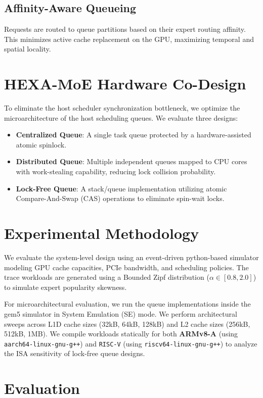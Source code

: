 \documentclass[conference]{IEEEtran}
\begin{document}
\subsection{Affinity-Aware Queueing}
Requests are routed to queue partitions based on their expert routing affinity. This minimizes active cache replacement on the GPU, maximizing temporal and spatial locality.

\section{HEXA-MoE Hardware Co-Design}
To eliminate the host scheduler synchronization bottleneck, we optimize the microarchitecture of the host scheduling queues. We evaluate three designs:
\begin{itemize}
    \item \textbf{Centralized Queue}: A single task queue protected by a hardware-assisted atomic spinlock.
    \item \textbf{Distributed Queue}: Multiple independent queues mapped to CPU cores with work-stealing capability, reducing lock collision probability.
    \item \textbf{Lock-Free Queue}: A stack/queue implementation utilizing atomic Compare-And-Swap (CAS) operations to eliminate spin-wait locks.
\end{itemize}

\section{Experimental Methodology}
We evaluate the system-level design using an event-driven python-based simulator modeling GPU cache capacities, PCIe bandwidth, and scheduling policies. The trace workloads are generated using a Bounded Zipf distribution ($\alpha \in [0.8, 2.0]$) to simulate expert popularity skewness.

For microarchitectural evaluation, we run the queue implementations inside the gem5 simulator in System Emulation (SE) mode. We perform architectural sweeps across L1D cache sizes (32kB, 64kB, 128kB) and L2 cache sizes (256kB, 512kB, 1MB). We compile workloads statically for both \textbf{ARMv8-A} (using \texttt{aarch64-linux-gnu-g++}) and \texttt{RISC-V} (using \texttt{riscv64-linux-gnu-g++}) to analyze the ISA sensitivity of lock-free queue designs.

\section{Evaluation}
\end{document}
